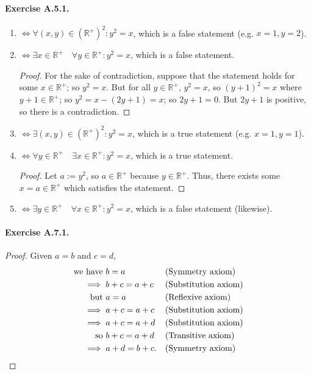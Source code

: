 \paragraph{Exercise A.5.1.}
\begin{enumerate}
    \item $\iff \forall (x,y) \in (\mathbb{R}^+)^2  : y^2=x$, which is a false statement (e.g. $x=1,y=2$). 
    \item $\iff \exists x \in \mathbb{R}^+ \quad \forall y \in \mathbb{R}^+ : y^2=x$, which is a false statement. \begin{proof}
        For the sake of contradiction, suppose that the statement holds for some $x \in \mathbb{R}^+$; so $y^2=x$. But for all $y \in \mathbb{R}^+$, $y^2=x$, so $(y+1)^2=x$ where $y+1 \in \mathbb{R}^+$; so $y^2=x-(2y+1)=x$; so $2y+1=0$. But $2y+1$ is positive, so there is a contradiction.
    \end{proof}
    \item $\iff \exists (x,y) \in (\mathbb{R}^+)^2  : y^2=x$, which is a true statement (e.g. $x=1,y=1$). 
    \item $\iff \forall y \in \mathbb{R}^+ \quad \exists x \in \mathbb{R}^+ : y^2=x$, which is a true statement. \begin{proof}
        Let $a := {y}^2$, so $a\in \mathbb{R}^+$ because $y \in \mathbb{R}^+$. Thus, there exists some $x=a\in \mathbb{R}^+$ which satisfies the statement.
    \end{proof}
    \item $\iff \exists y \in \mathbb{R}^+ \quad \forall x \in \mathbb{R}^+ : y^2=x$, which is a false statement (likewise).
\end{enumerate}

\paragraph{Exercise A.7.1.}
\begin{proof}
    Given $a=b$ and $c = d$,
    \begin{align*}
        \text{we have } {} &b=a && \text{(Symmetry axiom)}\\
        \implies {} &b+c=a+c && \text{(Substitution axiom)}\\
        \text{but } {} &a=a && \text{(Reflexive axiom)}\\
        \implies {} &a+c=a+c && \text{(Substitution axiom)}\\
        \implies {} &a+c=a+d && \text{(Substitution axiom)}\\
        \text{so } {} &b+c=a+d && \text{(Transitive axiom)}\\
        \implies {} &a+d=b+c. && \text{(Symmetry axiom)} \qedhere
    \end{align*}
\end{proof}